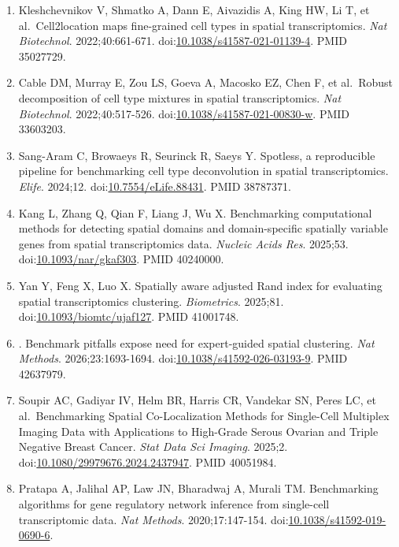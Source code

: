 \documentclass[11pt]{article}
\begin{document}
\begin{enumerate}
  PMID 36253792.
\item
  Kleshchevnikov V, Shmatko A, Dann E, Aivazidis A, King HW, Li T, et
  al.~Cell2location maps fine-grained cell types in spatial
  transcriptomics. \emph{Nat Biotechnol}. 2022;40:661-671.
  doi:\href{https://doi.org/10.1038/s41587-021-01139-4}{10.1038/s41587-021-01139-4}.
  PMID 35027729.
\item
  Cable DM, Murray E, Zou LS, Goeva A, Macosko EZ, Chen F, et al.~Robust
  decomposition of cell type mixtures in spatial transcriptomics.
  \emph{Nat Biotechnol}. 2022;40:517-526.
  doi:\href{https://doi.org/10.1038/s41587-021-00830-w}{10.1038/s41587-021-00830-w}.
  PMID 33603203.
\item
  Sang-Aram C, Browaeys R, Seurinck R, Saeys Y. Spotless, a reproducible
  pipeline for benchmarking cell type deconvolution in spatial
  transcriptomics. \emph{Elife}. 2024;12.
  doi:\href{https://doi.org/10.7554/eLife.88431}{10.7554/eLife.88431}.
  PMID 38787371.
\item
  Kang L, Zhang Q, Qian F, Liang J, Wu X. Benchmarking computational
  methods for detecting spatial domains and domain-specific spatially
  variable genes from spatial transcriptomics data. \emph{Nucleic Acids
  Res}. 2025;53.
  doi:\href{https://doi.org/10.1093/nar/gkaf303}{10.1093/nar/gkaf303}.
  PMID 40240000.
\item
  Yan Y, Feng X, Luo X. Spatially aware adjusted Rand index for
  evaluating spatial transcriptomics clustering. \emph{Biometrics}.
  2025;81.
  doi:\href{https://doi.org/10.1093/biomtc/ujaf127}{10.1093/biomtc/ujaf127}.
  PMID 41001748.
\item
  . Benchmark pitfalls expose need for expert-guided spatial clustering.
  \emph{Nat Methods}. 2026;23:1693-1694.
  doi:\href{https://doi.org/10.1038/s41592-026-03193-9}{10.1038/s41592-026-03193-9}.
  PMID 42637979.
\item
  Soupir AC, Gadiyar IV, Helm BR, Harris CR, Vandekar SN, Peres LC, et
  al.~Benchmarking Spatial Co-Localization Methods for Single-Cell
  Multiplex Imaging Data with Applications to High-Grade Serous Ovarian
  and Triple Negative Breast Cancer. \emph{Stat Data Sci Imaging}.
  2025;2.
  doi:\href{https://doi.org/10.1080/29979676.2024.2437947}{10.1080/29979676.2024.2437947}.
  PMID 40051984.
\item
  Pratapa A, Jalihal AP, Law JN, Bharadwaj A, Murali TM. Benchmarking
  algorithms for gene regulatory network inference from single-cell
  transcriptomic data. \emph{Nat Methods}. 2020;17:147-154.
  doi:\href{https://doi.org/10.1038/s41592-019-0690-6}{10.1038/s41592-019-0690-6}.

\end{enumerate}
\end{document}
